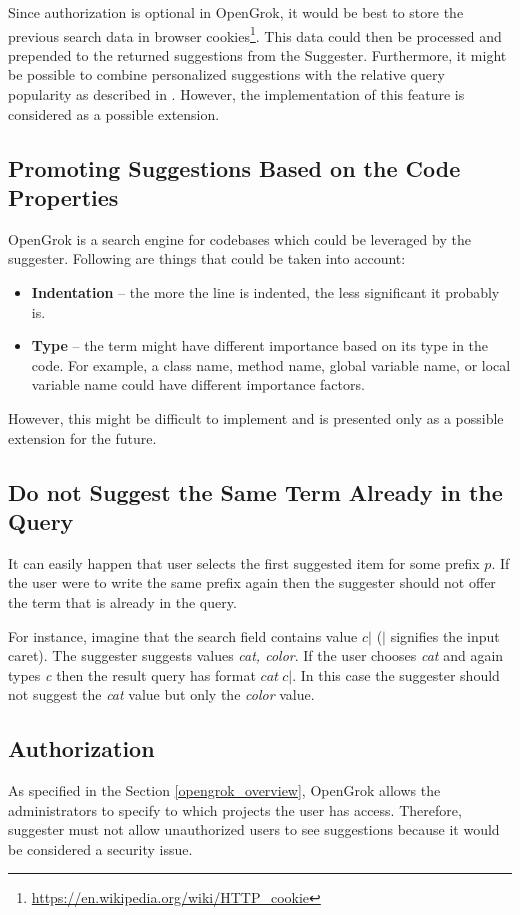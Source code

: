 Since authorization is optional
in OpenGrok, it would be best to store the previous search data in browser
cookies\footnote{\url{https://en.wikipedia.org/wiki/HTTP_cookie}}. This data could then be processed and
prepended to the returned suggestions from the Suggester. Furthermore, it might be possible to combine personalized
suggestions with the relative query popularity as described in \citep{Cai_time-sensitivepersonalized}.
However, the implementation of this feature is considered as a possible extension.

\subsection{Promoting Suggestions Based on the Code Properties}
OpenGrok is a search engine for codebases which could be leveraged by the suggester. Following are things that could
be taken into account:
\begin{itemize}
    \item \textbf{Indentation} – the more the line is indented, the less significant it probably is.
    \item \textbf{Type} – the term might have different importance based on its type in the code. For example, a
    class name, method name, global variable name, or local variable name could have different importance factors.
\end{itemize}

However, this might be difficult to implement and is presented only as a possible extension for the future.

\subsection{Do not Suggest the Same Term Already in the Query}
It can easily happen that user selects the first suggested item for some prefix $p$. If the user were to write the same
prefix again then the suggester should not offer the term that is already in the query.

For instance, imagine that the search field contains value $c\vert$ ($\vert$ signifies the input caret). The suggester
suggests values \textit{cat, color}. If the user chooses \textit{cat} and again types \textit{c} then the result
query has format $cat\ c\vert$. In this case the suggester should not suggest the \textit{cat} value but only the \textit{color}
value.

\subsection{Authorization}
As specified in the Section \ref{opengrok_overview}, OpenGrok allows the administrators to specify to which projects the user has
access. Therefore, suggester must not allow unauthorized users to see suggestions because it would be considered a security issue.

